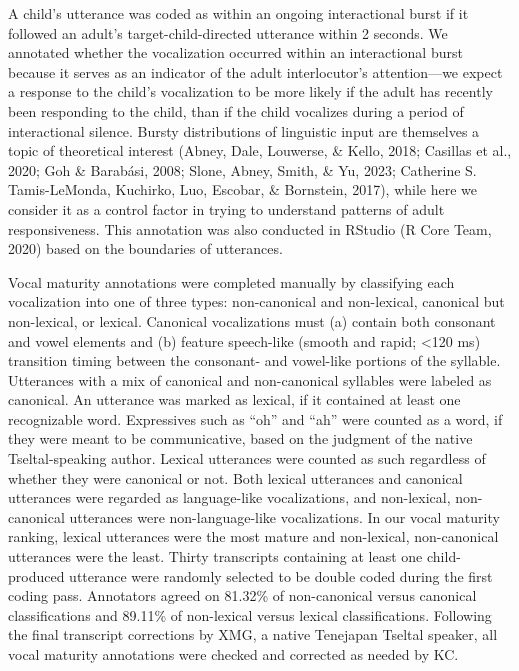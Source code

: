 \documentclass[
  man]{apa6}
\begin{document}
A child's utterance was coded as within an ongoing interactional burst if it followed an adult's target-child-directed utterance within 2 seconds. We annotated whether the vocalization occurred within an interactional burst because it serves as an indicator of the adult interlocutor's attention---we expect a response to the child's vocalization to be more likely if the adult has recently been responding to the child, than if the child vocalizes during a period of interactional silence. Bursty distributions of linguistic input are themselves a topic of theoretical interest (Abney, Dale, Louwerse, \& Kello, 2018; Casillas et al., 2020; Goh \& Barabási, 2008; Slone, Abney, Smith, \& Yu, 2023; Catherine S. Tamis-LeMonda, Kuchirko, Luo, Escobar, \& Bornstein, 2017), while here we consider it as a control factor in trying to understand patterns of adult responsiveness. This annotation was also conducted in RStudio (R Core Team, 2020) based on the boundaries of utterances.

Vocal maturity annotations were completed manually by classifying each vocalization into one of three types: non-canonical and non-lexical, canonical but non-lexical, or lexical. Canonical vocalizations must (a) contain both consonant and vowel elements and (b) feature speech-like (smooth and rapid; \textless120 ms) transition timing between the consonant- and vowel-like portions of the syllable. Utterances with a mix of canonical and non-canonical syllables were labeled as canonical. An utterance was marked as lexical, if it contained at least one recognizable word. Expressives such as ``oh'' and ``ah'' were counted as a word, if they were meant to be communicative, based on the judgment of the native Tseltal-speaking author. Lexical utterances were counted as such regardless of whether they were canonical or not. Both lexical utterances and canonical utterances were regarded as language-like vocalizations, and non-lexical, non-canonical utterances were non-language-like vocalizations. In our vocal maturity ranking, lexical utterances were the most mature and non-lexical, non-canonical utterances were the least. Thirty transcripts containing at least one child-produced utterance were randomly selected to be double coded during the first coding pass. Annotators agreed on 81.32\% of non-canonical versus canonical classifications and 89.11\% of non-lexical versus lexical classifications. Following the final transcript corrections by XMG, a native Tenejapan Tseltal speaker, all vocal maturity annotations were checked and corrected as needed by KC.
\end{document}
